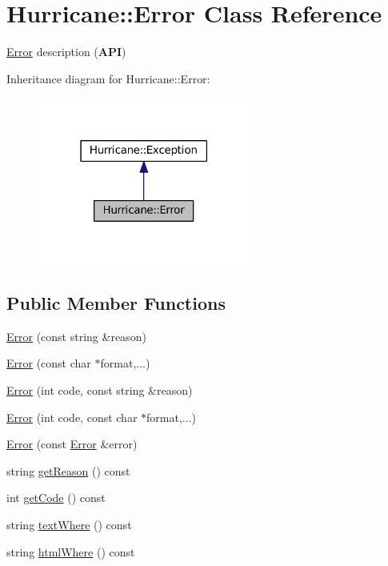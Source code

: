 \hypertarget{classHurricane_1_1Error}{}\section{Hurricane\+:\+:Error Class Reference}
\label{classHurricane_1_1Error}


\mbox{\hyperlink{classHurricane_1_1Error}{Error}} description ({\bfseries A\+PI})  




Inheritance diagram for Hurricane\+:\+:Error\+:\nopagebreak
\begin{figure}[H]
\begin{center}
\leavevmode
\includegraphics[width=198pt]{classHurricane_1_1Error__inherit__graph}
\end{center}
\end{figure}
\subsection*{Public Member Functions}
\begin{DoxyCompactItemize}
\item 
\mbox{\hyperlink{classHurricane_1_1Error_ab58387c890740ed8082532c5342f2d03}{Error}} (const string \&reason)
\item 
\mbox{\hyperlink{classHurricane_1_1Error_a98f50dcce8258982d450e8f5f79cff38}{Error}} (const char $\ast$format,...)
\item 
\mbox{\hyperlink{classHurricane_1_1Error_a33e4d2a1ea71be6395dc2716b68378c8}{Error}} (int code, const string \&reason)
\item 
\mbox{\hyperlink{classHurricane_1_1Error_a32ccc14fe29d7d2a7b5fe66ee0a3845c}{Error}} (int code, const char $\ast$format,...)
\item 
\mbox{\hyperlink{classHurricane_1_1Error_a7d90d5f5727dab2a9cc0a6427fb2b084}{Error}} (const \mbox{\hyperlink{classHurricane_1_1Error}{Error}} \&error)
\item 
string \mbox{\hyperlink{classHurricane_1_1Error_a1a18927a2d4eb2b0b0acfc2908be7008}{get\+Reason}} () const
\item 
int \mbox{\hyperlink{classHurricane_1_1Error_a1ba11c6ba6eff9fdf2923520fe80a6b2}{get\+Code}} () const
\item 
string \mbox{\hyperlink{classHurricane_1_1Error_ab3b8bb521802f332340eaf0b37eb1dfc}{text\+Where}} () const
\item 
string \mbox{\hyperlink{classHurricane_1_1Error_afafcbeae105f75906c7c45024de41c18}{html\+Where}} () const
\end{DoxyCompactItemize}
